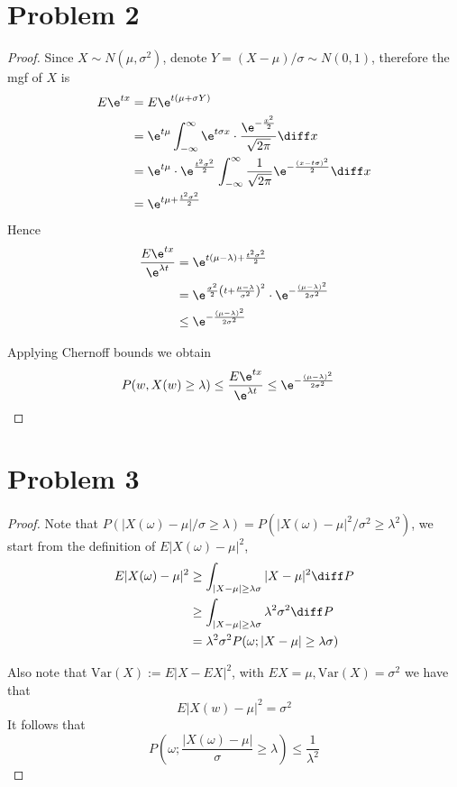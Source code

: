     \section{Problem 2}
    \begin{proof}
        Since $X\sim N(\mu,\sigma^2)$,
        denote $Y=(X-\mu)/\sigma\sim N(0,1)$, therefore
        the mgf of $X$ is
        \begin{align*}
            E\e^{tx}&=E\e^{t(\mu+\sigma Y)}\\
                    &=\e^{t\mu}\int_{-\infty}^\infty\e^{t\sigma x}
                      \cdot\frac{\e^{-\frac{x^2}2}}{\sqrt{2\pi}}\diff x\\
                    &=\e^{t\mu}\cdot\e^{\frac{t^2\sigma^2}{2}}\int_{-\infty}^{\infty}
                      \frac{1}{\sqrt{2\pi}}\e^{-\frac{(x-t\sigma)^2}{2}}
                      \diff x\\
                    &=\e^{t\mu+\frac{t^2\sigma^2}{2}}
        \end{align*}
        Hence
        \begin{align*}
            \frac{E\e^{tx}}{\e^{\lambda t}}&=\e^{t(\mu-\lambda)+\frac{t^2\sigma^2}{2}}\\
            &=\e^{\frac{\sigma^2}{2}\left(t+\frac{\mu-\lambda}{\sigma^2}\right)^2}
              \cdot\e^{-\frac{(\mu-\lambda)^2}{2\sigma^2}}\\
            &\leq\e^{-\frac{(\mu-\lambda)^2}{2\sigma^2}}
        \end{align*}

        Applying Chernoff bounds we obtain
        \begin{align*}
            P(w,X(w)\geq\lambda)&\leq\frac{E\e^{tx}}{\e^{\lambda t}}
            \leq\e^{-\frac{(\mu-\lambda)^2}{2\sigma^2}}
        \end{align*}
    \end{proof}

    \section{Problem 3}
    \begin{proof}
        Note that $P(|X(\omega)-\mu|/\sigma\geq\lambda)
        =P(|X(\omega)-\mu|^2/\sigma^2\geq\lambda^2)$,
        we start from the definition of $E|X(\omega)-\mu|^2$,
        \begin{align*}
            E|X(\omega)-\mu|^2
            &\geq\int_{|X-\mu|\geq\lambda\sigma}|X-\mu|^2\diff P\\
            &\geq\int_{|X-\mu|\geq\lambda\sigma}\lambda^2\sigma^2\diff P\\
            &=\lambda^2\sigma^2 P(\omega;|X-\mu|\geq \lambda\sigma)
        \end{align*}

        Also note that $\mathrm{Var}(X):=E|X-EX|^2$,
        with $EX=\mu,\mathrm{Var}(X)=\sigma^2$ we have that
        \[E|X(w)-\mu|^2=\sigma^2\]
        It follows that
        \[P\left(\omega;\frac{|X(\omega)-\mu|}{\sigma}\geq\lambda\right)
        \leq\frac{1}{\lambda^2}\]
    \end{proof}

